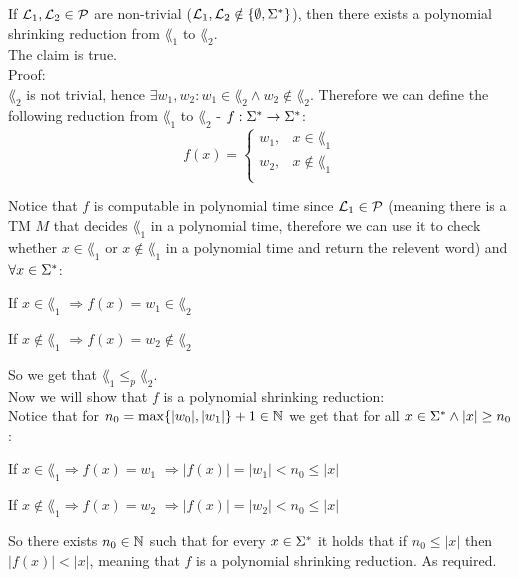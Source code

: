 If $\mathcal{L}_1, \mathcal{L}_2 \in \mathcal{P}$ are non-trivial ($\mathcal{L}_1, \mathcal{L}_2 \notin \{\emptyset, \Sigma^*\}$), then there exists a polynomial shrinking
reduction from $\lang_1$ to $\lang_2$. \\
The claim is true. \\

Proof: \\
$\lang_2$ is not trivial, hence $\exists w_1, w_2: w_1 \in \lang_2 \wedge w_2 \notin \lang_2$.
Therefore we can define the following reduction from $\lang_1$ to $\lang_2$ - $f: \Sigma^* \rightarrow \Sigma^*$:
\[
    f(x) =
    \begin{cases}
        w_1 , & x \in \lang_1    \\
        w_2 , & x \notin \lang_1 \\
    \end{cases}
\]

Notice that $f$ is computable in polynomial time since $\mathcal{L}_1 \in \mathcal{P}$ (meaning there is a TM
$M$ that decides $\lang_1$ in a polynomial time, therefore we can use it to check whether
$x \in \lang_1$ or $x \notin \lang_1$ in a polynomial time and return the relevent word) and $\forall x \in \Sigma^*$:

If $x \in \lang_1$
$\Longrightarrow f(x) = w_1 \in \lang_2$

If $x \notin \lang_1$
$\Longrightarrow f(x) = w_2 \notin \lang_2$

So we get that $\lang_1 \leq_p \lang_2$. \\

Now we will show that $f$ is a polynomial shrinking reduction: \\
Notice that for $n_0 = \max\{|w_0|, |w_1|\} + 1 \in \mathbb{N}$ we get that for all $x \in \Sigma^* \wedge |x| \geq n_0$:

If $x \in \lang_1 \Longrightarrow f(x) = w_1$
$\Longrightarrow |f(x)| = |w_1| < n_0 \leq |x|$

If $x \notin \lang_1 \Longrightarrow f(x) = w_2$
$\Longrightarrow |f(x)| = |w_2| < n_0 \leq |x|$

So there exists $n_0 \in \mathbb{N}$ such that for every $x \in \Sigma^*$ it holds that if $n_0 \leq |x|$ then $|f(x)| < |x|$,
meaning that $f$ is a polynomial shrinking reduction. As required.